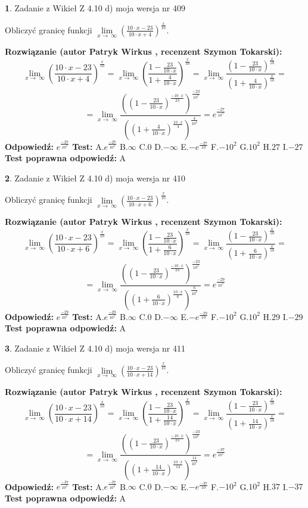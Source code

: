 \documentclass[12pt, a4paper]{article}
\theoremstyle{definition} %
\newtheorem{zad}{}
\newcommand{\zadStart}[1]{\begin{zad}#1\newline}
\newcommand{\zadStop}{\end{zad}}
\newcommand{\rozwStart}[2]{\noindent \textbf{Rozwiązanie (autor #1 , recenzent #2): }\newline}
\newcommand{\rozwStop}{\newline}
\newcommand{\odpStart}{\noindent \textbf{Odpowiedź:}\newline}
\newcommand{\odpStop}{\newline}
\newcommand{\testStart}{\noindent \textbf{Test:}\newline}
\newcommand{\testStop}{\newline}
\newcommand{\kluczStart}{\noindent \textbf{Test poprawna odpowiedź:}\newline}
\newcommand{\kluczStop}{\newline}
\begin{document}
\zadStart{Zadanie z Wikieł Z 4.10 d) moja wersja nr 409}


Obliczyć granicę funkcji  $\lim\limits_{x\to\ \infty}(\frac{10\cdot x-23}{10\cdot x+4})^{\frac{x}{10}}$.
\zadStop
\rozwStart{Patryk Wirkus}{Szymon Tokarski}
$$\lim\limits_{x\to\ \infty}(\frac{10\cdot x-23}{10\cdot x+4})^{\frac{x}{10}} = \lim\limits_{x\to\ \infty}(\frac{1-\frac{23}{10\cdot x}}{1+\frac{4}{10\cdot x}})^{\frac{x}{10}}=\lim\limits_{x\to\ \infty}\frac{(1-\frac{23}{10\cdot x})^{\frac{x}{10}}}{(1+\frac{4}{10\cdot x})^{\frac{x}{10}}}=$$
$$=\lim\limits_{x\to\ \infty}\frac{((1-\frac{23}{10\cdot x})^{\frac{-10\cdot x}{23}})^{\frac{-23}{10^{2}}}}{((1+\frac{4}{10\cdot x})^{\frac{10\cdot x}{4}})^{\frac{4}{10^{2}}}}=e^{\frac{-27}{10^{2}}}$$
\rozwStop
\odpStart
$e^{\frac{-27}{10^{2}}}$
\odpStop
\testStart
A.$e^{\frac{-27}{10^{2}}}$ B.$\infty$ C.$0$ D.$-\infty$ E.$-e^{\frac{-27}{10}}$
F.$-10^{2}$ G.$10^{2}$
H.$27$
I.$-27$
\testStop
\kluczStart
A
\kluczStop



\zadStart{Zadanie z Wikieł Z 4.10 d) moja wersja nr 410}


Obliczyć granicę funkcji  $\lim\limits_{x\to\ \infty}(\frac{10\cdot x-23}{10\cdot x+6})^{\frac{x}{10}}$.
\zadStop
\rozwStart{Patryk Wirkus}{Szymon Tokarski}
$$\lim\limits_{x\to\ \infty}(\frac{10\cdot x-23}{10\cdot x+6})^{\frac{x}{10}} = \lim\limits_{x\to\ \infty}(\frac{1-\frac{23}{10\cdot x}}{1+\frac{6}{10\cdot x}})^{\frac{x}{10}}=\lim\limits_{x\to\ \infty}\frac{(1-\frac{23}{10\cdot x})^{\frac{x}{10}}}{(1+\frac{6}{10\cdot x})^{\frac{x}{10}}}=$$
$$=\lim\limits_{x\to\ \infty}\frac{((1-\frac{23}{10\cdot x})^{\frac{-10\cdot x}{23}})^{\frac{-23}{10^{2}}}}{((1+\frac{6}{10\cdot x})^{\frac{10\cdot x}{6}})^{\frac{6}{10^{2}}}}=e^{\frac{-29}{10^{2}}}$$
\rozwStop
\odpStart
$e^{\frac{-29}{10^{2}}}$
\odpStop
\testStart
A.$e^{\frac{-29}{10^{2}}}$ B.$\infty$ C.$0$ D.$-\infty$ E.$-e^{\frac{-29}{10}}$
F.$-10^{2}$ G.$10^{2}$
H.$29$
I.$-29$
\testStop
\kluczStart
A
\kluczStop



\zadStart{Zadanie z Wikieł Z 4.10 d) moja wersja nr 411}


Obliczyć granicę funkcji  $\lim\limits_{x\to\ \infty}(\frac{10\cdot x-23}{10\cdot x+14})^{\frac{x}{10}}$.
\zadStop
\rozwStart{Patryk Wirkus}{Szymon Tokarski}
$$\lim\limits_{x\to\ \infty}(\frac{10\cdot x-23}{10\cdot x+14})^{\frac{x}{10}} = \lim\limits_{x\to\ \infty}(\frac{1-\frac{23}{10\cdot x}}{1+\frac{14}{10\cdot x}})^{\frac{x}{10}}=\lim\limits_{x\to\ \infty}\frac{(1-\frac{23}{10\cdot x})^{\frac{x}{10}}}{(1+\frac{14}{10\cdot x})^{\frac{x}{10}}}=$$
$$=\lim\limits_{x\to\ \infty}\frac{((1-\frac{23}{10\cdot x})^{\frac{-10\cdot x}{23}})^{\frac{-23}{10^{2}}}}{((1+\frac{14}{10\cdot x})^{\frac{10\cdot x}{14}})^{\frac{14}{10^{2}}}}=e^{\frac{-37}{10^{2}}}$$
\rozwStop
\odpStart
$e^{\frac{-37}{10^{2}}}$
\odpStop
\testStart
A.$e^{\frac{-37}{10^{2}}}$ B.$\infty$ C.$0$ D.$-\infty$ E.$-e^{\frac{-37}{10}}$
F.$-10^{2}$ G.$10^{2}$
H.$37$
I.$-37$
\testStop
\kluczStart
A
\kluczStop
\end{document}
